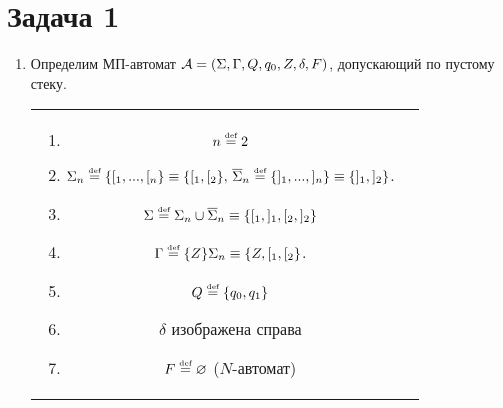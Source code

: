 \documentclass[a4paper]{article}
\def\A{{\cal A}}
\def\eqdef{\overset{\mbox{\tiny def}}{=}}
\begin{document}
\section*{Задача 1}
\begin{enumerate}
\item Определим МП-автомат $\A=(\Sigma,\Gamma,Q,q_0,Z,\delta,F)$, допускающий по пустому стеку.\newline
\begin{tabular}{cc}
\begin{minipage}{0.46\textwidth}
\begin{enumerate}
\item $n\eqdef2$
\item $\Sigma_n\eqdef\{[_1,...,[_n\}\equiv\{[_1,[_2\},\,\overline{\Sigma}_n\eqdef\{]_1,...,]_n\}\equiv\{]_1,]_2\}$.
\item $\Sigma\eqdef\Sigma_n\cup\overline{\Sigma}_n\equiv\{[_1,]_1,[_2,]_2\}$
\item $\Gamma\eqdef\{Z\}\Sigma_n\equiv\{Z,[_1,[_2\}$.
\item $Q\eqdef\{q_0,q_1\}$
\item $\delta$ изображена справа
\item $F\eqdef\varnothing$ ($N$-автомат)
\end{enumerate}
\end{minipage}
&
\begin{minipage}{0.46\textwidth}


\end{minipage}
\end{tabular}
\end{enumerate}
\end{document}
